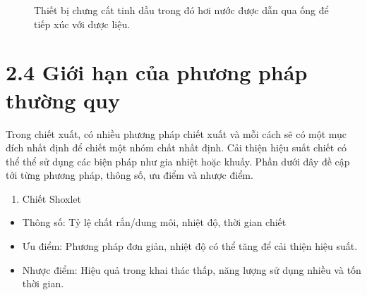\documentclass[
  twocolumn,
  landscape]{report}
\providecommand{\tightlist}{%
  \setlength{\itemsep}{0pt}\setlength{\parskip}{0pt}}\usepackage{longtable,booktabs,array}
\begin{document}
\begin{figure}


\caption{\label{fig-DirectSteamDistillation}Thiết bị chưng cất tinh dầu
trong đó hơi nước được dẫn qua ống để tiếp xúc với dược liệu.}

\end{figure}%

\section{2.4 Giới hạn của phương pháp thường
quy}\label{giux1edbi-hux1ea1n-cux1ee7a-phux1b0ux1a1ng-phuxe1p-thux1b0ux1eddng-quy}

Trong chiết xuất, có nhiều phương pháp chiết xuất và mỗi cách sẽ có một
mục đích nhất định để chiết một nhóm chất nhất định. Cải thiện hiệu suất
chiết có thể thể sử dụng các biện pháp như gia nhiệt hoặc khuấy. Phần
dưới đây đề cập tới từng phương pháp, thông số, ưu điểm và nhược điểm.

\begin{enumerate}
\def\labelenumi{\arabic{enumi}.}
\tightlist
\item
  Chiết Shoxlet
\end{enumerate}

\begin{itemize}
\tightlist
\item
  Thông số: Tỷ lệ chất rắn/dung môi, nhiệt độ, thời gian chiết
\item
  Ưu điểm: Phương pháp đơn giản, nhiệt độ có thể tăng để cải thiện hiệu
  suất.
\item
  Nhược điểm: Hiệu quả trong khai thác thấp, năng lượng sử dụng nhiều và
  tốn thời gian.
\end{itemize}
\end{document}
